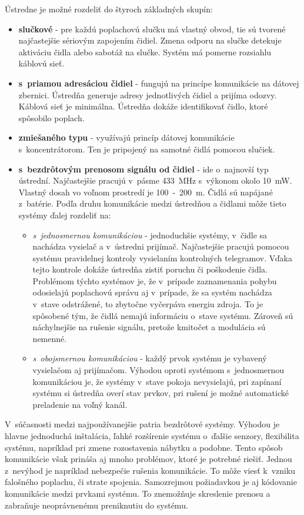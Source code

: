 Ústredne je možné rozdeliť do štyroch základných skupín:
\begin{itemize}
    \item \textbf{slučkové} - pre každú poplachovú slučku má vlastný obvod, tie sú tvorené najčastejšie sériovým zapojením čidiel. Zmena odporu na slučke detekuje aktiváciu čidla alebo sabotáž na slučke. Systém má pomerne rozsiahlu káblovú sieť.
    \item \textbf{s~priamou adresáciou čidiel} - fungujú na princípe komunikácie na dátovej zbernici. Ústredňa generuje adresy jednotlivých čidiel a prijíma odozvy. Káblová sieť je minimálna. Ústredňa dokáže identifikovať čidlo, ktoré spôsobilo poplach.
    \item \textbf{zmiešaného typu} - využívajú princíp dátovej komunikácie s~koncentrátorom. Ten je pripojený na samotné čidlá pomocou slučiek.
    \item \textbf{s~bezdrôtovým prenosom signálu od čidiel} - ide o~najnovší typ ústrední. Najčastejšie pracujú v~pásme 433~MHz s~výkonom okolo 10~mW. Vlastný dosah vo voľnom prostredí je 100~-~200~m. Čidlá sú napájané z~batérie.
    Podľa druhu komunikácie medzi ústredňou a čidlami môže tieto systémy ďalej rozdeliť na:
    \begin{itemize}
        \item \textit{s~jednosmernou komunikáciou} - jednoduchšie systémy, v~čidle sa nachádza vysielač a v~ústredni prijímač. Najčastejšie pracujú pomocou systému pravidelnej kontroly vysielaním kontrolných telegramov. Vďaka tejto kontrole dokáže ústredňa zistiť poruchu či poškodenie čidla. Problémom týchto systémov je, že v~prípade zaznamenania pohybu odosielajú poplachovú správu aj v~prípade, že sa systém nachádza v~stave odstrážené, to zbytočne vyčerpáva energiu zdroja. To je spôsobené tým, že čidlá nemajú informáciu o~stave systému. Zároveň sú náchylnejšie na rušenie signálu, pretože kmitočet a modulácia sú nemenné.
        \item \textit{s~obojsmernou komunikáciou} - každý prvok systému je vybavený vysielačom aj prijímačom. Výhodou oproti systémom s~jednosmernou komunikáciou je, že systémy v~stave pokoja nevysielajú, pri zapínaní systému si ústredňa overí stav prvkov, pri rušení je možné automatické preladenie na voľný kanál.
    \end{itemize}
\end{itemize}

V~súčasnosti medzi najpoužívanejšie patria bezdrôtové systémy. Výhodou je hlavne jednoduchá inštalácia, ľahké rozšírenie systému o~ďalšie senzory, flexibilita systému, napríklad pri zmene rozostavenia nábytku a podobne. Tento spôsob komunikácie však prináša aj mnoho problémov, ktoré je potrebné riešiť. Jednou z~nevýhod je napríklad nebezpečie rušenia komunikácie. To môže viesť k~vzniku falošného poplachu, či strate spojenia. Samozrejmou požiadavkou je aj kódovanie komunikácie medzi prvkami systému. To znemožňuje skreslenie prenosu a zabraňuje neoprávnenému preniknutiu do systému.\cite{Krecek}


